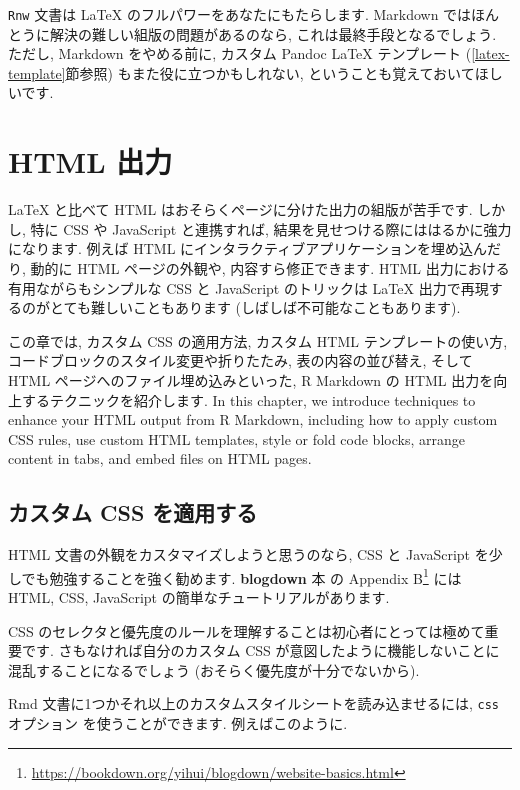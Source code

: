 \documentclass[
  11pt,
]{bxjsreport}
\renewcommand{\href}[2]{#2\footnote{\url{#1}}}
\begin{document}
\texttt{Rnw} 文書は LaTeX のフルパワーをあなたにもたらします. Markdown ではほんとうに解決の難しい組版の問題があるのなら, これは最終手段となるでしょう. ただし, Markdown をやめる前に, カスタム Pandoc LaTeX テンプレート (\ref{latex-template}節参照) もまた役に立つかもしれない, ということも覚えておいてほしいです.

\hypertarget{html-output}{%
\chapter{HTML 出力}\label{html-output}}

LaTeX と比べて HTML はおそらくページに分けた出力の組版が苦手です. しかし, 特に CSS や JavaScript と連携すれば, 結果を見せつける際にははるかに強力になります. 例えば HTML にインタラクティブアプリケーションを埋め込んだり, 動的に HTML ページの外観や, 内容すら修正できます. HTML 出力における有用ながらもシンプルな CSS と JavaScript のトリックは LaTeX 出力で再現するのがとても難しいこともあります (しばしば不可能なこともあります).

この章では, カスタム CSS の適用方法, カスタム HTML テンプレートの使い方, コードブロックのスタイル変更や折りたたみ, 表の内容の並び替え, そして HTML ページへのファイル埋め込みといった, R Markdown の HTML 出力を向上するテクニックを紹介します. In this chapter, we introduce techniques to enhance your HTML output from R Markdown, including how to apply custom CSS rules, use custom HTML templates, style or fold code blocks, arrange content in tabs, and embed files on HTML pages.

\hypertarget{html-css}{%
\section{カスタム CSS を適用する}\label{html-css}}

HTML 文書の外観をカスタマイズしようと思うのなら, CSS と JavaScript を少しでも勉強することを強く勧めます. \textbf{blogdown} 本 \autocite{blogdown2017} の \href{https://bookdown.org/yihui/blogdown/website-basics.html}{Appendix B} には HTML, CSS, JavaScript の簡単なチュートリアルがあります.

CSS のセレクタと優先度のルールを理解することは初心者にとっては極めて重要です. さもなければ自分のカスタム CSS が意図したように機能しないことに混乱することになるでしょう (おそらく優先度が十分でないから).

Rmd 文書に1つかそれ以上のカスタムスタイルシートを読み込ませるには, \texttt{css} オプション を使うことができます. 例えばこのように.
\end{document}
